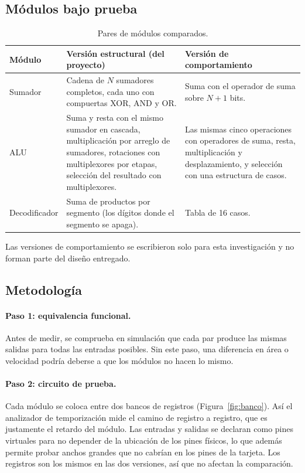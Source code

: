 \documentclass[11pt,letterpaper]{article}
\begin{document}
\subsection{Módulos bajo prueba}

\begin{table}[H]
\centering
\caption{Pares de módulos comparados.}
\label{tab:modulos}
\begin{tabular}{p{2.6cm}p{6cm}p{6cm}}
\toprule
Módulo & Versión estructural (del proyecto) & Versión de comportamiento \\
\midrule
Sumador & Cadena de $N$ sumadores completos, cada uno con compuertas XOR, AND y OR. &
Suma con el operador de suma sobre $N+1$ bits. \\
ALU & Suma y resta con el mismo sumador en cascada, multiplicación por arreglo de sumadores,
rotaciones con multiplexores por etapas, selección del resultado con multiplexores. &
Las mismas cinco operaciones con operadores de suma, resta, multiplicación y desplazamiento, y
selección con una estructura de casos. \\
Decodificador & Suma de productos por segmento (los dígitos donde el segmento se apaga). &
Tabla de 16 casos. \\
\bottomrule
\end{tabular}
\end{table}

Las versiones de comportamiento se escribieron solo para esta investigación y no forman parte del
diseño entregado.

\subsection{Metodología}

\paragraph{Paso 1: equivalencia funcional.} Antes de medir, se comprueba en simulación que cada
par produce las mismas salidas para todas las entradas posibles. Sin este paso, una diferencia en
área o velocidad podría deberse a que los módulos no hacen lo mismo.

\paragraph{Paso 2: circuito de prueba.} Cada módulo se coloca entre dos bancos de registros
(Figura~\ref{fig:banco}). Así el analizador de temporización mide el camino de registro a
registro, que es justamente el retardo del módulo. Las entradas y salidas se declaran como pines
virtuales para no depender de la ubicación de los pines físicos, lo que además permite probar
anchos grandes que no cabrían en los pines de la tarjeta. Los registros son los mismos en las dos
versiones, así que no afectan la comparación.
\end{document}
